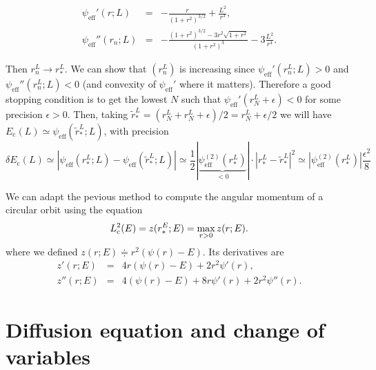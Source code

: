 \documentclass[11pt]{article}
\newcommand{\psieff}{\psi_{\mathrm{eff}}}
\newcommand{\Ec}{E_{{\mathrm{c}}}}
\begin{document}
\begin{equation}
\begin{array}{ccl}
 \psieff'(r;L) & =& \displaystyle{-\frac{r}{(1+r^{2})^{3/2}}+\frac{L^{2}}{r^{3}}} ,\\
  
  \psieff''(r_{n};L) & =&\displaystyle{-\frac{(1+r^{2})^{3/2}-3r^{2}\sqrt{1+r^{2}}}{(1+r^{2})^{3}}-3\frac{L^{2}}{r^{4}}} .
\end{array}
\label{eq:psieff_derivatives}
\end{equation}

Then $r_{n}^{L}\rightarrow r_{*}^{L}$. We can show that $(r_{n}^{L})$
is increasing since $\psieff'(r_{n}^{L};L)>0$ and $\psieff''(r_{n}^{L};L)<0$
(and convexity of $\psieff'$ where it matters). Therefore
a good stopping condition is to get the lowest $N$ such that $\psieff'(r_{N}^{L}+\epsilon)<0$
for some precision $\epsilon>0$. Then, taking $\tilde{r}_{*}^{L}=(r_{N}^{L}+r_{N}^{L}+\epsilon)/2=r_{N}^{L}+\epsilon/2$
we will have $\Ec(L)\simeq\psieff(\tilde{r}_{*}^{L};L)$,
with precision 
\begin{equation}
\delta \Ec(L)\simeq|\psieff(r_{*}^{L};L)-\psieff(\tilde{r}_{*}^{L};L)|\simeq\frac{1}{2}|\underbrace{\psieff^{(2)}(r_{*}^{L})}_{<0}|\cdot|r_{*}^{L}-\tilde{r}_{*}^{L}|^{2}\simeq|\psieff^{(2)}(r_{*}^{L})|\frac{\epsilon^{2}}{8}
\label{eq:precision_Ec}
\end{equation}

We can adapt the pevious method to compute the angular momentum of a circular orbit using the equation
\begin{equation}
L_{{\rm c}}^{2}(E)=z(r_{*}^{E};E)=\max_{r>0}z(r;E).
\label{eq:angular_circular}
\end{equation}
where we defined $z(r;E)\doteqdot r^{2}(\psi(r)-E)$. Its derivatives are
\begin{equation}
\begin{array}{ccl}
  z'(r;E) & =& \displaystyle{4r(\psi(r)-E)+2r^{2}\psi'(r)} ,\\
  
  z''(r;E) & =&\displaystyle{4(\psi(r)-E)+8r\psi'(r)+2r^{2}\psi''(r)} .
\end{array}
\label{eq:z_derivatives}
\end{equation}

\section{Diffusion equation and change of variables}
\label{sec:diffEq_changeVar}
\end{document}
